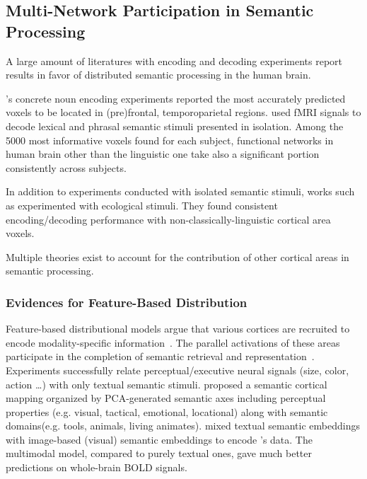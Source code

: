 \subsection{Multi-Network Participation in Semantic Processing}
\label{subsec:multinetworkParticipation}
A large amount of literatures with encoding and decoding experiments report results in favor of distributed semantic processing in the human brain. 

\textcite{mitchellPredictingHumanBrain2008}'s concrete noun encoding experiments reported the most accurately predicted voxels to be located in (pre)frontal, temporoparietal regions. \textcite{pereiraUniversalDecoderLinguistic2018} used fMRI signals to decode lexical and phrasal semantic stimuli presented in isolation. Among the 5000 most informative voxels found for each subject, functional networks in human brain other than the linguistic one take also a significant portion consistently across subjects. 

In addition to experiments conducted with isolated semantic stimuli, works such as \textcite{todorovicAnalysesIRMfLors2018, verdierEncodageActiviteNeuronale2018, huthContinuousSemanticSpace2012} experimented with ecological stimuli. They found consistent encoding\slash decoding performance with non-classically-linguistic cortical area voxels.

Multiple theories exist to account for the contribution of other cortical areas in semantic processing.   

\subsubsection{Evidences for Feature-Based Distribution}
\label{subsec: featurebaseddistribution}
Feature-based distributional models argue that various cortices are recruited to encode modality-specific information~\parencite{chaoAttributebasedNeuralSubstrates1999, haukSomatotopicRepresentationAction2004, goldbergPerceptualKnowledgeRetrieval2006}. The parallel activations of these areas participate in the completion of semantic retrieval and representation~\parencite{pattersonWhereYouKnow2007}. Experiments \parencite{borghesaniWordMeaningVentral2016, moseleySensorimotorSemanticsSpot2013, shtyrovDistributedNeuronalNetworks2004} successfully relate perceptual\slash executive neural signals (size, color, action \dots) with only textual semantic stimuli. \textcite{huthNaturalSpeechReveals2016} proposed a semantic cortical mapping organized by PCA-generated semantic axes including perceptual properties (e.g. visual, tactical, emotional, locational) along with semantic domains(e.g. tools, animals, living animates). \textcite{rowtulaDeepAutoencoderNearPerfect2018} mixed textual semantic embeddings with image-based (visual) semantic embeddings to encode \textcite{pereiraUniversalDecoderLinguistic2018}'s data. The multimodal model, compared to purely textual ones, gave much better predictions on whole-brain BOLD signals.

